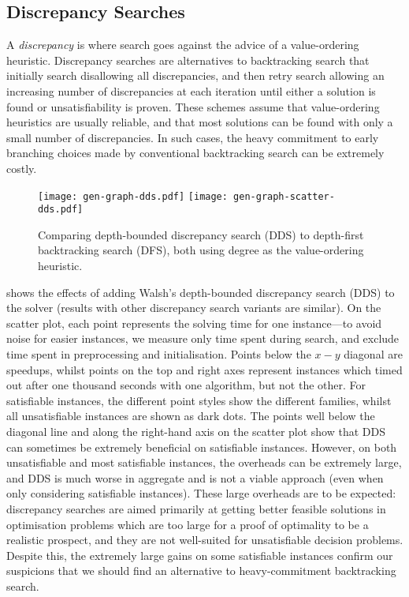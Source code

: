 \documentclass[runningheads]{llncs}
\begin{document}
\subsection{Discrepancy Searches}

A \emph{discrepancy} is where search goes against the advice of a value-ordering heuristic.
Discrepancy searches
\cite{DBLP:conf/ijcai/HarveyG95,DBLP:conf/aaai/Korf96,DBLP:conf/ijcai/Walsh97,DBLP:conf/cpaior/KarouiHLN07}
are alternatives to backtracking search that initially search disallowing all discrepancies, and
then retry search allowing an increasing number of discrepancies at each iteration until either a
solution is found or unsatisfiability is proven. These schemes assume that value-ordering heuristics
are usually reliable, and that most solutions can be found with only a small number of
discrepancies. In such cases, the heavy commitment to early branching choices made by conventional
backtracking search can be extremely costly.

\begin{figure}[tb]
    \texttt{[image: gen-graph-dds.pdf]}
    \hfill
    \texttt{[image: gen-graph-scatter-dds.pdf]}

    \caption{Comparing depth-bounded discrepancy search (DDS) to depth-first backtracking search
    (DFS), both using degree as the value-ordering heuristic.}\label{figure:scatter-dds}
\end{figure}

 shows the effects of adding Walsh's \cite{DBLP:conf/ijcai/Walsh97}
depth-bounded discrepancy search (DDS) to the solver (results with other discrepancy search variants
are similar). On the scatter plot, each point represents the solving time for one instance---to
avoid noise for easier instances, we measure only time spent during search, and exclude time spent
in preprocessing and initialisation.  Points below the $x-y$ diagonal are speedups, whilst points on
the top and right axes represent instances which timed out after one thousand seconds with one
algorithm, but not the other. For satisfiable instances, the different point styles show the
different families, whilst all unsatisfiable instances are shown as dark dots.  The points well
below the diagonal line and along the right-hand axis on the scatter plot show that DDS can
sometimes be extremely beneficial on satisfiable instances.  However, on both unsatisfiable and most
satisfiable instances, the overheads can be extremely large, and DDS is much worse in aggregate and
is not a viable approach (even when only considering satisfiable instances).  These large overheads
are to be expected: discrepancy searches are aimed primarily at getting better feasible solutions in
optimisation problems which are too large for a proof of optimality to be a realistic prospect, and
they are not well-suited for unsatisfiable decision problems. Despite this, the extremely large
gains on some satisfiable instances confirm our suspicions that we should find an alternative to
heavy-commitment backtracking search.
\end{document}
